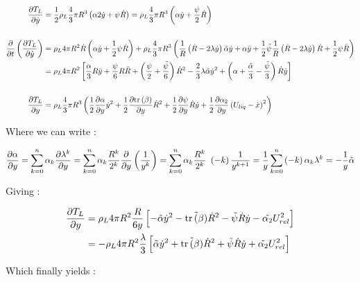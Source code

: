 \begin{align}
\frac{\partial T_{L}}{\partial \dot{y}}&=\frac{1}{2}\rho_{L}\frac{4}{3}\pi R^{3}\left( \alpha 2\dot{y}+\psi\dot{R} \right)=\rho_{L}\frac{4}{3}\pi R^{3}\left( \alpha \dot{y} + \frac{\psi}{2}\dot{R} \right)\\
\nonumber \\
\frac{\partial }{\partial t}\left( \frac{\partial T_{L}}{\partial \dot{y}} \right)&=\rho_{L}4\pi R^{2}\dot{R}\left( \alpha \dot{y} + \frac{1}{2} \psi \dot{R} \right)+\rho_{L}\frac{4}{3}\pi R^{3}\left( \frac{1}{R}\left( \dot{R}-2\lambda \dot{y} \right)\tilde{\alpha}\dot{y} +\alpha\ddot{y}+\frac{1}{2}\tilde{\psi}\frac{1}{R}\left( \dot{R}-2\lambda \dot{y} \right)\dot{R} +\frac{1}{2}\psi \ddot{R} \right)\\
&=\rho_{L}4\pi R^{2}\left[ \frac{\alpha}{3}R\ddot{y}+\frac{\psi}{6}R \ddot{R} + \left( \frac{\psi}{2} +\frac{\tilde{\psi}}{6} \right)\dot{R}^{2} -\frac{2}{3}\lambda \tilde{\alpha} \dot{y}^{2} + \left(  \alpha + \frac{\tilde{\alpha}}{3} - \frac{\tilde{\psi}}{3}  \right)\dot{R}\dot{y}  \right]\\
\nonumber \\
\frac{\partial T_{L}}{\partial y}&=\rho_{L}\frac{4}{3}\pi R^{3} \left(  \frac{1}{2} \frac{\partial \alpha}{\partial y}\dot{y}^{2} + \frac{1}{2} \frac{\partial \mathrm{tr}\left( \beta \right)}{\partial y}\dot{R}^{2}+\frac{1}{2}\frac{\partial \psi}{\partial y}\dot{R}\dot{y}+\frac{1}{2}\frac{\partial \alpha_{2}}{\partial y}\left( U_{liq}-\dot{x} \right)^{2}  \right) 
\end{align}

Where we can write :

\begin{align}
\frac{\partial \alpha}{\partial y}=\sum_{k=0}^{n}\alpha_{k}\frac{\partial \lambda^{k}}{\partial y} = \sum_{k=0}^{n}\alpha_{k}\frac{R^{k}}{2^{k}}\frac{\partial }{\partial y}\left( \frac{1}{y^{k}} \right)=\sum_{k=0}^{n}\alpha_{k}\frac{R^{k}}{2^{k}}~\left( -k \right)\frac{1}{y^{k+1}}=\frac{1}{y}\sum_{k=0}^{n}\left( -k \right)\alpha_{k}\lambda^{k}=-\frac{1}{y}\tilde{\alpha}
\end{align} 

Giving : 

\begin{align}
\frac{\partial T_{L}}{\partial y}&=\rho_{L}4\pi R^{2}\frac{R}{6y}\left[ -\tilde{\alpha}\dot{y}^{2}-\tilde{\mathrm{tr}\left( \beta \right)}\dot{R}^{2}-\tilde{\psi}\dot{R}\dot{y}-\tilde{\alpha_{2}}U_{rel}^{2} \right]\\
&=-\rho_{L}4\pi R^{2}\frac{\lambda}{3}\left[ \tilde{\alpha}\dot{y}^{2}+\tilde{\mathrm{tr}\left( \beta \right)}\dot{R}^{2}+\tilde{\psi}\dot{R}\dot{y}+\tilde{\alpha_{2}}U_{rel}^{2} \right]
\end{align}

Which finally yields : 

